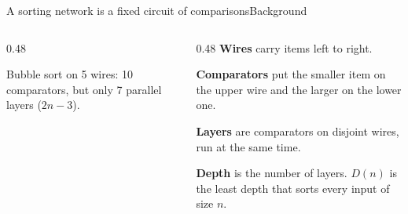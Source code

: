 \documentclass[aspectratio=169,9pt,xcolor=table]{beamer}
\newlength{\px}\setlength{\px}{0.0083333cm} %
\newcommand{\cmp}[4][10]{\draw[line width=6\px] (#2,#3) -- (#2,#4); \fill (#2,#3) circle[radius=#1\px]; \fill (#2,#4) circle[radius=#1\px];}
\begin{document}
\begin{frame}{A sorting network is a fixed circuit of comparisons}{Background}
\begin{columns}[c]
\begin{column}{0.48\textwidth}
\par\vspace{0.15cm}
{\scriptsize\color{muted}Bubble sort on 5 wires: 10 comparators, but only 7 parallel layers ($2n-3$).}
\end{column}
\begin{column}{0.48\textwidth}
\textbf{Wires} carry items left to right.\par\medskip
\textbf{Comparators} put the smaller item on the upper wire and the larger on the lower one.\par\medskip
\textbf{Layers} are comparators on disjoint wires, run at the same time.\par\medskip
\textbf{Depth} is the number of layers. $D(n)$ is the least depth that sorts every input of size $n$.
\end{column}
\end{columns}
\end{frame}
\end{document}

